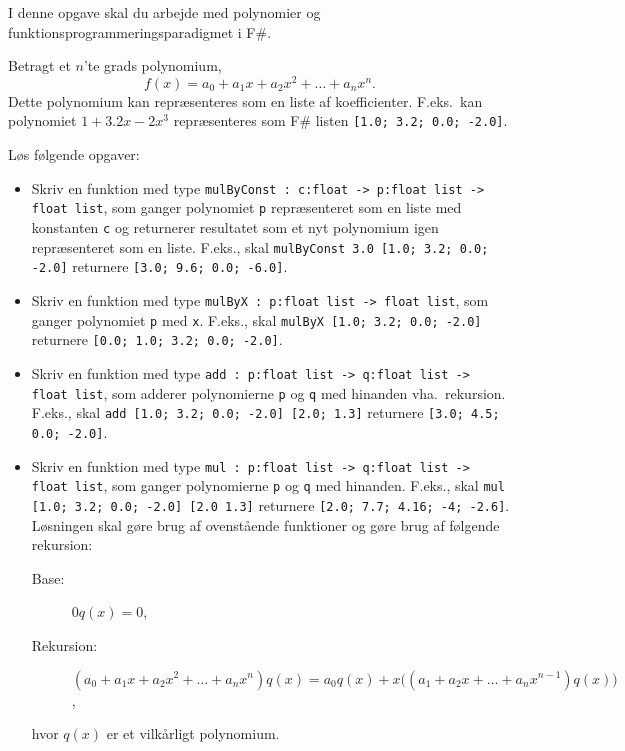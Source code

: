 I denne opgave skal du arbejde med polynomier og funktionsprogrammeringsparadigmet i F\#.

Betragt et $n$'te grads polynomium,
\begin{equation}
  \label{eq:1}
  f(x) = a_0+a_1x+a_2x^2+\ldots+a_nx^n.
\end{equation}
Dette polynomium kan repræsenteres som en liste af koefficienter. F.eks.\ kan polynomiet $1+3.2x-2x^3$ repræsenteres som F\# listen \lstinline{[1.0; 3.2; 0.0; -2.0]}.

Løs følgende opgaver:
\begin{itemize}
\item Skriv en funktion med type \lstinline{mulByConst : c:float -> p:float list -> float list}, som ganger polynomiet \lstinline{p} repræsenteret som en liste med konstanten \lstinline{c} og returnerer resultatet som et nyt polynomium igen repræsenteret som en liste. F.eks., skal \lstinline{mulByConst 3.0 [1.0; 3.2; 0.0; -2.0]} returnere \lstinline{[3.0; 9.6; 0.0; -6.0]}.
\item Skriv en funktion med type \lstinline{mulByX : p:float list -> float list}, som ganger polynomiet \lstinline{p} med \lstinline{x}. F.eks., skal \lstinline{mulByX [1.0; 3.2; 0.0; -2.0]} returnere \lstinline{[0.0; 1.0; 3.2; 0.0; -2.0]}.
\item Skriv en funktion med type \lstinline{add : p:float list -> q:float list -> float list}, som adderer polynomierne \lstinline{p} og \lstinline{q} med hinanden vha.\ rekursion. F.eks., skal \lstinline{add [1.0; 3.2; 0.0; -2.0] [2.0; 1.3]} returnere \lstinline{[3.0; 4.5; 0.0; -2.0]}.
\item Skriv en funktion med type \lstinline{mul : p:float list -> q:float list -> float list}, som ganger polynomierne \lstinline{p} og \lstinline{q} med hinanden. F.eks., skal \lstinline{mul [1.0; 3.2; 0.0; -2.0] [2.0 1.3]} returnere \lstinline{[2.0; 7.7; 4.16; -4; -2.6]}. Løsningen skal gøre brug af ovenstående funktioner og gøre brug af følgende rekursion:
  \begin{description}
  \item[Base:] $0 q(x) = 0$,\\
  \item[Rekursion:] $\left(a_0+a_1x+a_2x^2+\ldots+a_nx^n\right) q(x) = a_0q(x) + x\bigg(\left(a_1+a_2x+\ldots+a_nx^{n-1}\right)q(x)\bigg)$,
  \end{description}
  hvor $q(x)$ er et vilkårligt polynomium.
\end{itemize}
